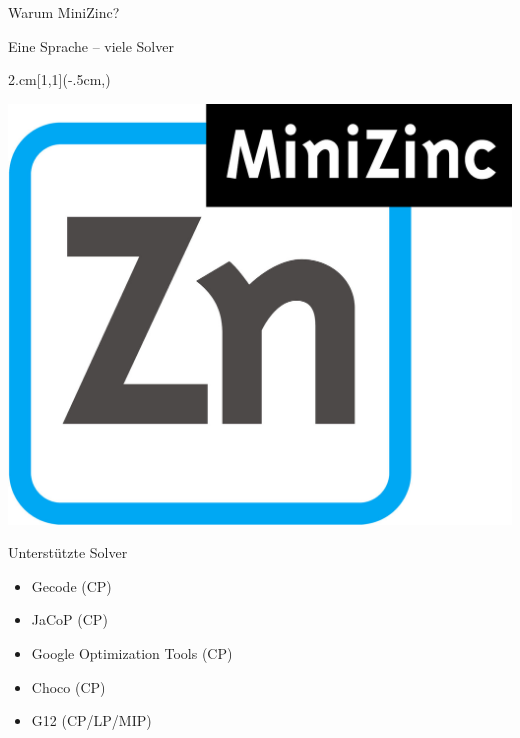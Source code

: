 \begin{frame}{Warum MiniZinc?}
\begin{parchment}[Rationale]
\centering 
\alert{Eine Sprache -- viele Solver} 
\end{parchment}
\begin{textblock*}{2.cm}[1,1](\textwidth-.5cm,\textheight-1.03cm)

\includegraphics[width=\textwidth]{img/MiniZn_logo.jpg} 

\end{textblock*}
Unterstützte Solver
\begin{itemize}
\item Gecode (CP)
\item JaCoP (CP)
\item Google Optimization Tools (CP)
\item Choco (CP)
\item G12 (CP/LP/MIP)
\end{itemize}

\end{frame}


%

